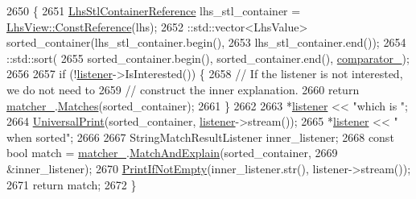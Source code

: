 \begin{DoxyCode}
2650                                                                       \{
2651       \hyperlink{classtesting_1_1internal_1_1WhenSortedByMatcher_1_1Impl_ab5e53a762bb213ccf84299b31c825b58}{LhsStlContainerReference} lhs\_stl\_container = 
      \hyperlink{classtesting_1_1internal_1_1StlContainerView_a36eccf53329730f6e55c12002128bf25}{LhsView::ConstReference}(lhs);
2652       ::std::vector<LhsValue> sorted\_container(lhs\_stl\_container.begin(),
2653                                                lhs\_stl\_container.end());
2654       ::std::sort(
2655            sorted\_container.begin(), sorted\_container.end(), \hyperlink{classtesting_1_1internal_1_1WhenSortedByMatcher_1_1Impl_a951b20230b095e7777c23cba8f143f32}{comparator\_});
2656 
2657       \textcolor{keywordflow}{if} (!\hyperlink{namespaceinteractive__marker_a0e579ab555212bb5e2c9f8a675b7618a}{listener}->IsInterested()) \{
2658         \textcolor{comment}{// If the listener is not interested, we do not need to}
2659         \textcolor{comment}{// construct the inner explanation.}
2660         \textcolor{keywordflow}{return} \hyperlink{classtesting_1_1internal_1_1WhenSortedByMatcher_1_1Impl_a4675b8bb38c5996ad8e570eafe4f72ea}{matcher\_}.\hyperlink{classtesting_1_1internal_1_1MatcherBase_a3b479673ff40cac1a7d548e91d789cb2}{Matches}(sorted\_container);
2661       \}
2662 
2663       *\hyperlink{namespaceinteractive__marker_a0e579ab555212bb5e2c9f8a675b7618a}{listener} << \textcolor{stringliteral}{"which is "};
2664       \hyperlink{namespacetesting_1_1internal_a30708fa2bacf11895b03bdb21eb72309}{UniversalPrint}(sorted\_container, \hyperlink{namespaceinteractive__marker_a0e579ab555212bb5e2c9f8a675b7618a}{listener}->stream());
2665       *\hyperlink{namespaceinteractive__marker_a0e579ab555212bb5e2c9f8a675b7618a}{listener} << \textcolor{stringliteral}{" when sorted"};
2666 
2667       StringMatchResultListener inner\_listener;
2668       \textcolor{keyword}{const} \textcolor{keywordtype}{bool} match = \hyperlink{classtesting_1_1internal_1_1WhenSortedByMatcher_1_1Impl_a4675b8bb38c5996ad8e570eafe4f72ea}{matcher\_}.\hyperlink{classtesting_1_1internal_1_1MatcherBase_a08429a6d7e7d330de4a4eb4e272105a7}{MatchAndExplain}(sorted\_container,
2669                                                   &inner\_listener);
2670       \hyperlink{namespacetesting_1_1internal_afa4cd5d7933878d6d820b32c87bb2767}{PrintIfNotEmpty}(inner\_listener.str(), listener->stream());
2671       \textcolor{keywordflow}{return} match;
2672     \}
\end{DoxyCode}
